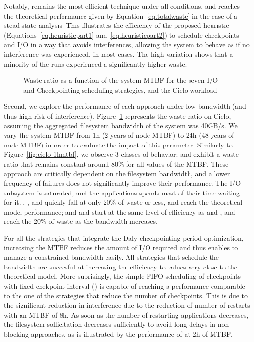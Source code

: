 Notably, \cooperative remains the most efficient technique under all
conditions, and reaches the theoretical performance given by
Equation~\eqref{eq.totalwaste} in the case of a stead state
analysis. This illustrates the efficiency of the proposed heuristic
(Equations~\eqref{eq.heuristicpart1} and~\eqref{eq.heuristicpart2}) to
schedule checkpoints and I/O in a way that avoids interferences,
allowing the system to behave as if no interference was experienced,
in most cases. The high variation shows that a minority of the runs
experienced a significantly higher waste.

\begin{figure}
  \begin{center}
    \resizebox{\linewidth}{!}{}
  \end{center}
  \caption{Waste ratio as a function of the system MTBF for the
    seven I/O and Checkpointing scheduling strategies, and the Cielo
    workload \label{fig:cielo-40gbs}}
\end{figure}

Second, we explore the performance of each approach under low
bandwidth (and thus high risk of
interference). Figure~\ref{fig:cielo-40gbs} represents the waste ratio
on Cielo, assuming the aggregated filesystem bandwidth of the system
was 40GB/s. We vary the system MTBF from 1h (2 years of node MTBF) to
24h (48 years of node MTBF) in order to evaluate the impact of this
parameter. Similarly to Figure~\ref{fig:cielo-1hmtbf}, we observe 3
classes of behavior: \propfixed and \bfifofixed exhibit a waste ratio
that remains constant around 80\% for all values of the MTBF. These
appraoch are critically dependent on the filesystem bandwidth, and a
lower frequency of failures does not significantly improve their
performance. The I/O subsystem is saturated, and the applications
spends most of their time waiting for it. \fifodaly, \fifofixed, and
\cooperative quickly fall at only 20\% of waste or less, and reach
the theoretical model performance; and \propdaly and \bfifodaly start
at the same level of efficiency as \propfixed and \bfifofixed, and
reach the 20\% of waste as the bandwidth increases.

For all the strategies that integrate the Daly checkpointing period
optimization, increasing the MTBF reduces the amount of I/O required
and thus enables to manage a constrained bandwidth easily. All
strategies that schedule the bandwidth are succesful at increasing the
efficiency to values very close to the theoretical model. More
suprisingly, the simple FIFO scheduling of checkpoints with fixed
chekpoint interval (\bfifofixed) is capable of reaching a performance
comparable to the one of the strategies that reduce the number of
checkpoints. This is due to the significant reduction in interference
due to the reduction of number of restarts with an MTBF of 8h. As soon
as the number of restarting applications decreases, the filesystem
sollicitation decreases sufficiently to avoid long delays in non blocking
approaches, as is illustrated by the performance of \fifofixed at 2h
of MTBF.


